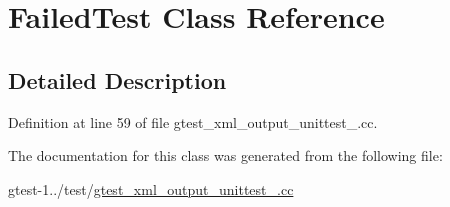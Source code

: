 \hypertarget{classFailedTest}{\section{\-Failed\-Test \-Class \-Reference}
\label{dd/dd8/classFailedTest}
}


\subsection{\-Detailed \-Description}


\-Definition at line 59 of file gtest\-\_\-xml\-\_\-output\-\_\-unittest\-\_\-.\-cc.



\-The documentation for this class was generated from the following file\-:\begin{DoxyCompactItemize}
\item 
gtest-\/1../test/\hyperlink{gtest__xml__output__unittest___8cc}{gtest\-\_\-xml\-\_\-output\-\_\-unittest\-\_\-.\-cc}\end{DoxyCompactItemize}
